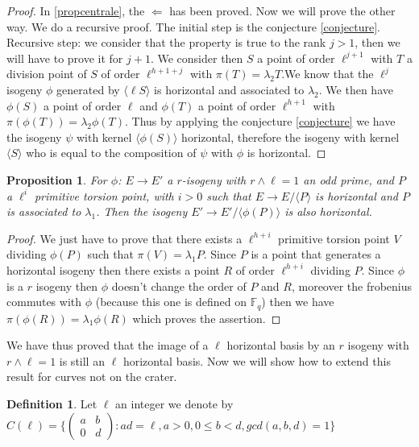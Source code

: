 \documentclass{article}
\theoremstyle{plain}
\newtheorem{prop}[thm]{Proposition}
\theoremstyle{definition}
\newtheorem{defi}[thm]{Definition}
\theoremstyle{remark}
\begin{document}
\begin{proof}
In \ref{propcentrale}, the $\Leftarrow$ has been proved. Now we will prove the other way.
\newline
We do a recursive proof. The initial step is the conjecture \ref{conjecture}.
\newline
Recursive step: we consider that the property is true to the rank $j>1$, then we will have to prove it for $j+1$.
We consider then $S$ a point of order $\ell^{j+1}$ with $T$ a division point of $S$ of order $\ell^{h+1+j}$ with $\pi(T)=\lambda_2T$.We know that the $\ell^j$ isogeny $\phi$ generated by $\langle \ell S \rangle$ is horizontal and associated to $\lambda_2$. We then have $\phi(S)$ a point of order $\ell$ and $\phi(T)$ a point of order $\ell^{h+1}$ with $\pi(\phi(T))=\lambda_2\phi(T)$. Thus by applying the conjecture \ref{conjecture} we have the isogeny $\psi$ with kernel $\langle \phi(S) \rangle$ horizontal, therefore the isogeny with kernel $\langle S \rangle$ who is equal to the composition of $\psi$ with $\phi$ is horizontal.
\end{proof}

\begin{prop}
For $\phi$: $E \rightarrow E'$ a $r$-isogeny  with $r \wedge \ell=1$ an odd prime, and $P$ a $\ell^i$ primitive torsion point, with $i>0$ such that $E \rightarrow E / \langle P \rangle $ is horizontal and $P$ is associated to $\lambda_1$. Then the isogeny  $E' \rightarrow E' / \langle \phi(P) \rangle$ is also horizontal.
\end{prop}

\begin{proof}
We just have to prove that there exists a $\ell^{h+i}$ primitive torsion point $V$ dividing $\phi(P)$ such that $\pi(V)=\lambda_1P$.
Since $P$ is a point that generates a horizontal isogeny then there exists a point $R$ of order $\ell^{h+i}$ dividing $P$. Since $\phi$ is a $r$ isogeny then $\phi$ doesn't change the order of $P$ and $R$, moreover the frobenius commutes with $\phi$ (because this one is defined on $\mathbb{F}_q$) then we have $\pi(\phi(R))=\lambda_1\phi(R)$ which proves the assertion.
\end{proof}

We have thus proved that the image of a $\ell$ horizontal basis by an $r$ isogeny with $r \wedge \ell = 1$ is still an $\ell$ horizontal basis. Now we will show how to extend this result for curves not on the crater.


\begin{defi}
Let $\ell$ an integer we denote by
$C(\ell)=\{\left(\begin{array}{cc}
a & b\\
0 & d
\end{array}\right): ad= \ell, a>0,0\leqslant b <d, gcd(a,b,d)=1\}$
\end{defi}
\end{document}
